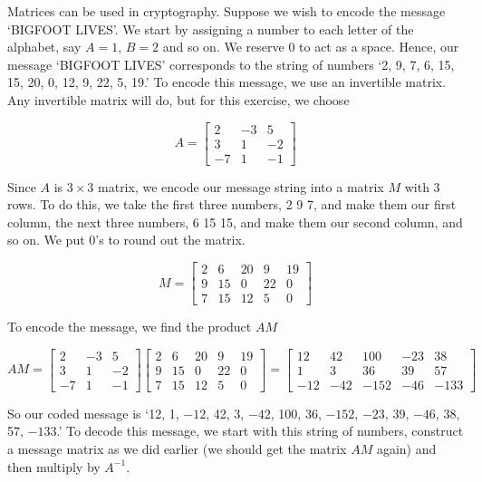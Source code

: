 \documentclass{ximera}
\begin{document}
\begin{problem}
Matrices can be used in cryptography.  Suppose we wish to encode the message `BIGFOOT LIVES'.  We start by assigning a number to each letter of the alphabet, say $A=1$, $B=2$ and so on.  We reserve $0$ to act as a space.  Hence, our message `BIGFOOT LIVES' corresponds to the string of numbers `2, 9, 7, 6, 15, 15, 20, 0, 12, 9, 22, 5, 19.' To encode this message, we use an invertible matrix.  Any invertible matrix will do, but for this exercise, we choose

\[ A = \left[ \begin{array}{rrr} 2 & -3 & 5 \\ 3 & 1 &-2 \\ -7 & 1 & -1 \end{array} \right] \]

Since $A$ is  $3 \times 3$ matrix, we encode our message string into a matrix $M$ with $3$ rows.  To do this, we take the first three numbers, 2 9 7, and make them our first column, the next three numbers, 6 15 15, and make them our second column, and so on.  We put $0$'s to round out the matrix.


\[ M = \left[  \begin{array}{rrrrr} 2 & 6 & 20 & 9 & 19 \\ 9 & 15 & 0 & 22 & 0 \\ 7 & 15 & 12 & 5 & 0 \end{array} \right] \]

To encode the message, we find the product $AM$

\[AM =  \left[ \begin{array}{rrr} 2 & -3 & 5 \\ 3 & 1 &-2 \\ -7 & 1 & -1 \end{array} \right]\left[  \begin{array}{rrrrr} 2 & 6 & 20 & 9 & 19 \\ 9 & 15 & 0 & 22 & 0 \\ 7 & 15 & 12 & 5 & 0 \end{array} \right] = \left[  \begin{array}{rrrrr} 12 & 42 & 100 & -23 & 38 \\ 1 & 3 & 36 & 39 & 57 \\ -12 & -42 & -152 & -46 & -133 \end{array} \right]\]

So our coded message is `12, 1, $-12$, 42, 3, $-42$, 100, 36, $-152$, $-23$, 39, $-46$, 38, 57, $-133$.'  To decode this message, we start with this string of numbers, construct a message matrix as we did earlier (we should get the matrix $AM$ again) and then multiply by $A^{-1}$.


\end{problem}
\end{document}
